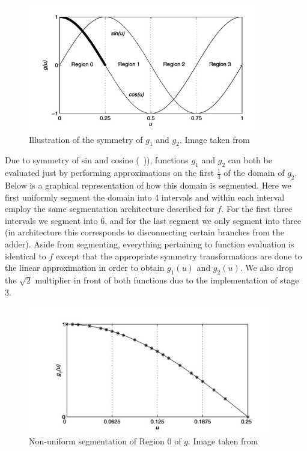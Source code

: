 \begin{figure}
\centering\CaptionFontSize
\includegraphics[height=15em]
{Figures/g_symm.png}
\caption[Illustration of the symmetry of $g_1$ and $g_2$]
{Illustration of the symmetry of $g_1$ and $g_2$. Image taken from \cite{noise_gen}}
\label{Figure:NoiseGeneration:GSymmetry}
\end{figure}

Due to symmetry of sin and cosine (\Figure~)), functions $g_1$ and $g_2$ can both be evaluated just by performing approximations on the first $\frac{1}{4}$ of the domain of $g_2$. Below is a graphical representation of how this domain is segmented. Here we first uniformly segment the domain into 4 intervals and within each interval employ the same segmentation architecture described for $f$. For the first three intervals we segment into 6, and for the last segment we only segment into three (in architecture this corresponds to disconnecting certain branches from the adder). Aside from segmenting, everything pertaining to function evaluation is identical to $f$ except that the appropriate symmetry transformations are done to the linear approximation in order to obtain $g_1(u)$ and $g_2(u)$. We also drop the $\sqrt{2}$ multiplier in front of both functions due to the implementation of stage 3.

\begin{figure}
\centering\CaptionFontSize
\includegraphics[height=15em]
{Figures/g_segmentation.png}
\caption[Non-uniform segmentation of Region 0 of $g$]
{Non-uniform segmentation of Region 0 of $g$. Image taken from \cite{noise_gen}}
\label{Figure:NoiseGeneration:GSegmentation}
\end{figure}

